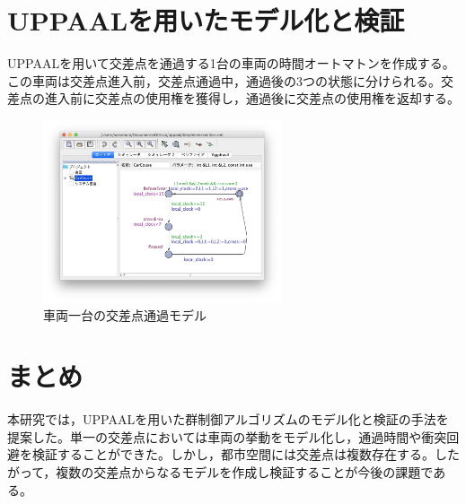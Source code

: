 \documentclass[10pt]{tpu-abst-utf}
\begin{document}
\section{UPPAALを用いたモデル化と検証}
UPPAALを用いて交差点を通過する1台の車両の時間オートマトンを作成する。
この車両は交差点進入前，交差点通過中，通過後の3つの状態に分けられる。交差点の進入前に交差点の使用権を獲得し，通過後に交差点の使用権を返却する。
\begin{figure}[htbp]
\centering
\includegraphics[width=70mm]{Simple.png}
\caption{車両一台の交差点通過モデル}
\label{Simple}
\end{figure}
\section{まとめ}
本研究では，UPPAALを用いた群制御アルゴリズムのモデル化と検証の手法を提案した。単一の交差点においては車両の挙動をモデル化し，通過時間や衝突回避を検証することができた。しかし，都市空間には交差点は複数存在する。したがって，複数の交差点からなるモデルを作成し検証することが今後の課題である。
\begin{thebibliography}{1}
\end{thebibliography}
%
\end{document}
